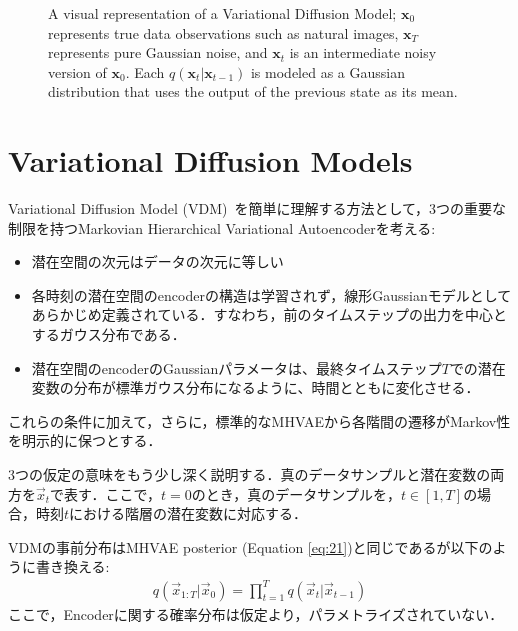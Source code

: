 \begin{figure}
  \centering
  \caption{A visual representation of a Variational Diffusion Model; $\bm{x}_0$ represents true data observations such as natural images, $\bm{x}_T$ represents pure Gaussian noise, and $\bm{x}_t$ is an intermediate noisy version of $\bm{x}_0$.  Each $q(\bm{x}_t|\bm{x}_{t-1})$ is modeled as a Gaussian distribution that uses the output of the previous state as its mean.}
  \label{fig:vdm}
\end{figure}

\section*{Variational Diffusion Models}
%
Variational Diffusion Model (VDM)~\cite{sohl2015deep, ho2020denoising, kingma2021variational}を簡単に理解する方法として，3つの重要な制限を持つMarkovian Hierarchical Variational Autoencoderを考える:
\begin{itemize}
    \item 潜在空間の次元はデータの次元に等しい
    \item 各時刻の潜在空間のencoderの構造は学習されず，線形Gaussianモデルとしてあらかじめ定義されている．すなわち，前のタイムステップの出力を中心とするガウス分布である．
    \item 潜在空間のencoderのGaussianパラメータは、最終タイムステップ$T$での潜在変数の分布が標準ガウス分布になるように、時間とともに変化させる．
\end{itemize}
これらの条件に加えて，さらに，標準的なMHVAEから各階間の遷移がMarkov性を明示的に保つとする．

3つの仮定の意味をもう少し深く説明する．真のデータサンプルと潜在変数の両方を$\vec{x}_t$で表す．ここで，$t=0$のとき，真のデータサンプルを，$t \in \left[1, T\right]$の場合，時刻$t$における階層の潜在変数に対応する．

VDMの事前分布はMHVAE posterior (Equation \ref{eq:21})と同じであるが以下のように書き換える:
\begin{align}
    q(\vec{x}_{1:T}|\vec{x}_0) = \prod_{t = 1}^{T}q(\vec{x}_{t}|\vec{x}_{t-1})
\end{align}
ここで，Encoderに関する確率分布は仮定より，パラメトライズされていない．

